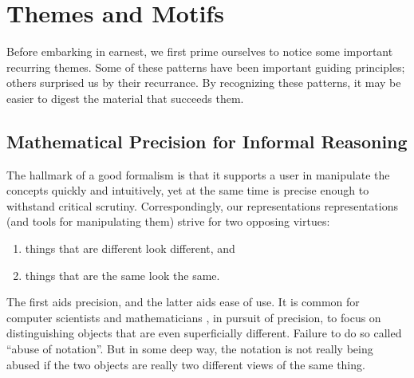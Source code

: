 \section{Themes and Motifs}


Before embarking in earnest, we first prime ourselves to notice some important recurring themes. 
Some of these patterns have been important guiding principles;
    others surprised us by their recurrance. 
By recognizing these patterns, it may be easier to digest the material that succeeds them. 


\subsection{Mathematical Precision for Informal Reasoning}

%
The hallmark of a good formalism is that it supports a user in manipulate the concepts quickly and intuitively, yet at the same time is precise enough to withstand critical scrutiny.
%
Correspondingly, our representations representations (and tools for manipulating them)
    strive for two opposing virtues:
\begin{enumerate}[nosep]
    \item things that are different look different, and
    \item things that are the same look the same. 
\end{enumerate}
The first aids precision, and the latter aids ease of use. 
It is common for computer scientists and mathematicians 
    \unskip,
    in pursuit of precision,
    to focus on distinguishing objects that are even superficially different.  
Failure to do so called ``abuse of notation''. 
%
But in some deep way, the notation is not really being abused if the two objects are really two different views of the same thing.

